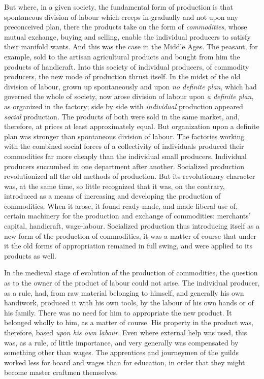 But where, in a given society, the fundamental form of production is that
spontaneous division of labour which creeps in gradually and not upon any
preconceived plan, there the products take on the form of \emph{commodities},
whose mutual exchange, buying and selling, enable the individual producers to
satisfy their manifold wants. And this was the case in the Middle Ages. The
peasant, for example, sold to the artisan agricultural products and bought from
him the products of handicraft. Into this society of individual producers, of
commodity producers, the new mode of production thrust itself. In the midst of
the old division of labour, grown up spontaneously and upon \emph{no definite
plan}, which had governed the whole of society, now arose division of labour
upon \emph{a definite plan}, as organized in the factory; side by side with
\emph{individual} production appeared \emph{social} production. The products of
both were sold in the same market, and, therefore, at prices at least
approximately equal. But organization upon a definite plan was stronger than
spontaneous division of labour. The factories working with the combined social
forces of a collectivity of individuals produced their commodities far more
cheaply than the individual small producers. Individual producers succumbed
in one department after another. Socialized production revolutionized all the
old methods of production. But its revolutionary character was, at the same
time, so little recognized that it was, on the contrary, introduced as a means
of increasing and developing the production of commodities. When it arose, it
found ready-made, and made liberal use of, certain machinery for the production
and exchange of commodities: merchants' capital, handicraft, wage-labour.
Socialized production thus introducing itself as a new form of the production
of commodities, it was a matter of course that under it the old forms of
appropriation remained in full swing, and were applied to its products as well.

In the medieval stage of evolution of the production of commodities, the
question as to the owner of the product of labour could not arise. The
individual producer, as a rule, had, from raw material belonging to himself, and
generally his own handiwork, produced it with his own tools, by the labour of
his own hands or of his family. There was no need for him to appropriate the new
product. It belonged wholly to him, as a matter of course. His property in the
product was, therefore, based \emph{upon his own labour}. Even where external
help was used, this was, as a rule, of little importance, and very generally was
compensated by something other than wages. The apprentices and journeymen of the
guilds worked less for board and wages than for education, in order that they
might become master craftmen themselves.
